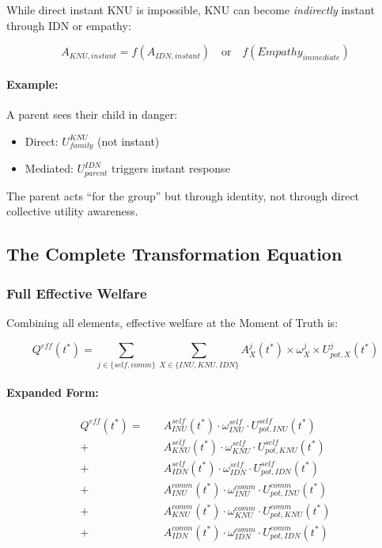 While direct instant KNU is impossible, KNU can become \emph{indirectly} instant
through IDN or empathy:

\begin{equation}
A_{KNU,instant} = f(A_{IDN,instant}) \quad \text{or} \quad f(Empathy_{immediate})
\end{equation}

\paragraph{Example:}
A parent sees their child in danger:
\begin{itemize}
\item Direct: $U^{KNU}_{family}$ (not instant)
\item Mediated: $U^{IDN}_{parent}$ triggers instant response
\end{itemize}

The parent acts ``for the group'' but through identity, not through direct
collective utility awareness.

\subsection{The Complete Transformation Equation}
\label{subsec:complete-transformation}

\subsubsection{Full Effective Welfare}

Combining all elements, effective welfare at the Moment of Truth is:

\begin{equation}
\boxed{
Q^{eff}(t^*) = \sum_{j \in \{self, comm\}} \sum_{X \in \{INU, KNU, IDN\}} A^j_X(t^*) \times \omega^j_X \times U^j_{pot,X}(t^*)
}
\label{eq:effective-welfare-complete}
\end{equation}

\paragraph{Expanded Form:}
\begin{align}
Q^{eff}(t^*) = \quad & A^{self}_{INU}(t^*) \cdot \omega^{self}_{INU} \cdot U^{self}_{pot,INU}(t^*) \nonumber \\
+ \quad & A^{self}_{KNU}(t^*) \cdot \omega^{self}_{KNU} \cdot U^{self}_{pot,KNU}(t^*) \nonumber \\
+ \quad & A^{self}_{IDN}(t^*) \cdot \omega^{self}_{IDN} \cdot U^{self}_{pot,IDN}(t^*) \nonumber \\
+ \quad & A^{comm}_{INU}(t^*) \cdot \omega^{comm}_{INU} \cdot U^{comm}_{pot,INU}(t^*) \nonumber \\
+ \quad & A^{comm}_{KNU}(t^*) \cdot \omega^{comm}_{KNU} \cdot U^{comm}_{pot,KNU}(t^*) \nonumber \\
+ \quad & A^{comm}_{IDN}(t^*) \cdot \omega^{comm}_{IDN} \cdot U^{comm}_{pot,IDN}(t^*)
\end{align}

